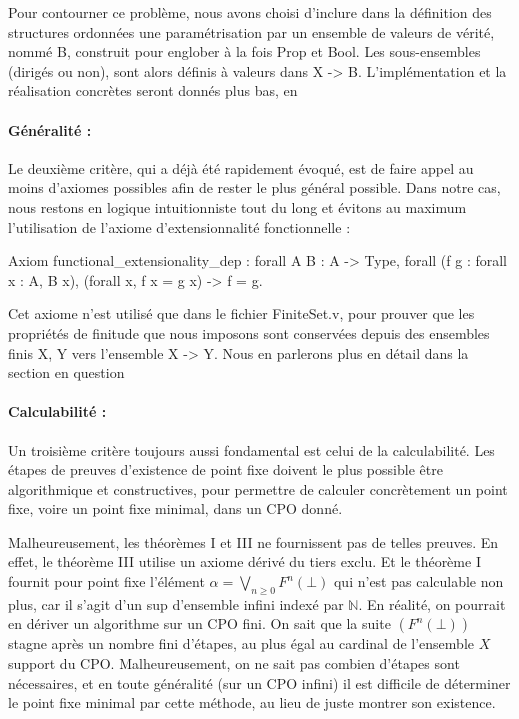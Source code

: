 \documentclass{article}
\newcommand\code[1]{{\fontfamily{lmtt}\selectfont #1}}
\theoremstyle{definition}
\begin{document}
Pour contourner ce problème, nous avons choisi d'inclure dans la définition des structures ordonnées une paramétrisation par un ensemble de valeurs de vérité, nommé \code{B}, construit pour englober à la fois \code{Prop} et \code{Bool}. Les sous-ensembles (dirigés ou non), sont alors définis à valeurs dans \code{X -> B}. L'implémentation et la réalisation concrètes seront donnés plus bas, en %

\paragraph{Généralité :\\}

Le deuxième critère, qui a déjà été rapidement évoqué, est de faire appel au moins d'axiomes possibles afin de rester le plus général possible. Dans notre cas, nous restons en logique intuitionniste tout du long et évitons au maximum l'utilisation de l'axiome d'extensionnalité fonctionnelle :

\begin{coq}
Axiom functional_extensionality_dep : forall {A} {B : A -> Type},
  forall (f g : forall x : A, B x),
  (forall x, f x = g x) -> f = g.
\end{coq}

Cet axiome n'est utilisé que dans le fichier \code{FiniteSet.v}, pour prouver que les propriétés de finitude que nous imposons sont conservées depuis des ensembles finis \code{X, Y} vers l'ensemble \code{X -> Y}. Nous en parlerons plus en détail dans la section en question %

\paragraph{Calculabilité :\\}

Un troisième critère toujours aussi fondamental est celui de la calculabilité. Les étapes de preuves d'existence de point fixe doivent le plus possible être algorithmique et constructives, pour permettre de calculer concrètement un point fixe, voire un point fixe minimal, dans un CPO donné.

Malheureusement, les théorèmes I et III ne fournissent pas de telles preuves. En effet, le théorème III utilise un axiome dérivé du tiers exclu. Et le théorème I fournit pour point fixe l'élément $ \alpha = \bigvee_{n \geq 0} F^n(\bot)$ qui n'est pas calculable non plus, car il s'agit d'un sup d'ensemble infini indexé par $\mathbb{N}$. En réalité, on pourrait en dériver un algorithme sur un CPO fini. On sait que la suite $(F^n(\bot))$ stagne après un nombre fini d'étapes, au plus égal au cardinal de l'ensemble $X$ support du CPO. Malheureusement, on ne sait pas combien d'étapes sont nécessaires, et en toute généralité (sur un CPO infini) il est difficile de déterminer le point fixe minimal par cette méthode, au lieu de juste montrer son existence.
\end{document}
